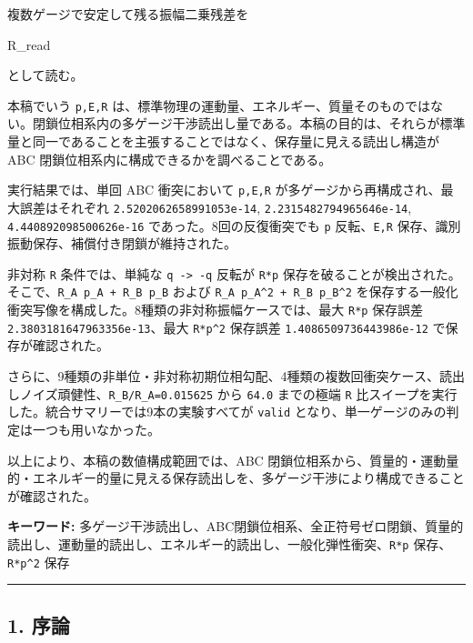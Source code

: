 \documentclass[
  a4paper,
]{article}
\newenvironment{Shaded}{}{}
\newcommand{\NormalTok}[1]{#1}
\begin{document}
複数ゲージで安定して残る振幅二乗残差を

\begin{Shaded}
\begin{Highlighting}[]
\NormalTok{R\_read}
\end{Highlighting}
\end{Shaded}

として読む。

本稿でいう \texttt{p,E,R}
は、標準物理の運動量、エネルギー、質量そのものではない。閉鎖位相系内の多ゲージ干渉読出し量である。本稿の目的は、それらが標準量と同一であることを主張することではなく、保存量に見える読出し構造が
ABC 閉鎖位相系内に構成できるかを調べることである。

実行結果では、単回 ABC 衝突において \texttt{p,E,R}
が多ゲージから再構成され、最大誤差はそれぞれ
\texttt{2.5202062658991053e-14}, \texttt{2.2315482794965646e-14},
\texttt{4.440892098500626e-16} であった。8回の反復衝突でも \texttt{p}
反転、\texttt{E,R} 保存、識別振動保存、補償付き閉鎖が維持された。

非対称 \texttt{R} 条件では、単純な \texttt{q\ -\textgreater{}\ -q}
反転が \texttt{R*p}
保存を破ることが検出された。そこで、\texttt{R\_A\ p\_A\ +\ R\_B\ p\_B}
および \texttt{R\_A\ p\_A\^{}2\ +\ R\_B\ p\_B\^{}2}
を保存する一般化衝突写像を構成した。8種類の非対称振幅ケースでは、最大
\texttt{R*p} 保存誤差 \texttt{2.3803181647963356e-13}、最大
\texttt{R*p\^{}2} 保存誤差 \texttt{1.4086509736443986e-12}
で保存が確認された。

さらに、9種類の非単位・非対称初期位相勾配、4種類の複数回衝突ケース、読出しノイズ頑健性、\texttt{R\_B/R\_A=0.015625}
から \texttt{64.0} までの極端 \texttt{R}
比スイープを実行した。統合サマリーでは9本の実験すべてが \texttt{valid}
となり、単一ゲージのみの判定は一つも用いなかった。

以上により、本稿の数値構成範囲では、ABC
閉鎖位相系から、質量的・運動量的・エネルギー的量に見える保存読出しを、多ゲージ干渉により構成できることが確認された。

\textbf{キーワード:}
多ゲージ干渉読出し、ABC閉鎖位相系、全正符号ゼロ閉鎖、質量的読出し、運動量的読出し、エネルギー的読出し、一般化弾性衝突、\texttt{R*p}
保存、\texttt{R*p\^{}2} 保存

\begin{center}\rule{0.5\linewidth}{0.5pt}\end{center}

\subsection{1. 序論}\label{ux5e8fux8ad6}
\end{document}
